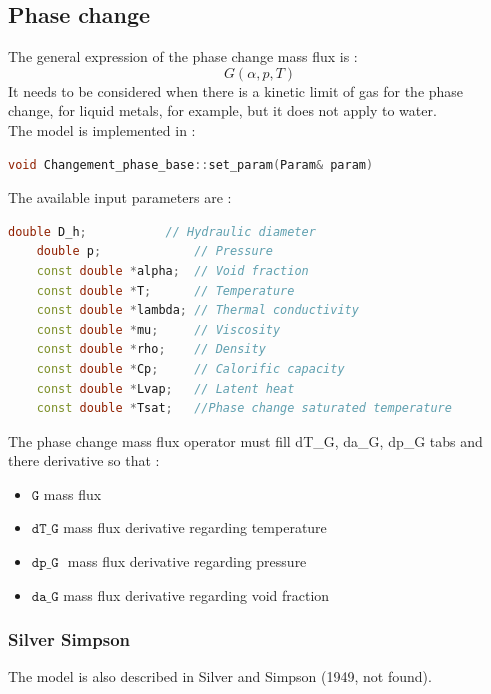 \subsection{Phase change}
The general expression of the phase change mass flux is :
\begin{equation}
    G(\alpha,p,T)
\end{equation}
It needs to be considered when there is a kinetic limit of gas for the phase change, for liquid metals, for example, but it does not apply to water.\\
The model is implemented in :
\begin{lstlisting}[language=c++]
void Changement_phase_base::set_param(Param& param)
\end{lstlisting}
The available input parameters are : 
\begin{lstlisting}[language=c++]
    double D_h;           // Hydraulic diameter
    double p;             // Pressure
    const double *alpha;  // Void fraction
    const double *T;      // Temperature
    const double *lambda; // Thermal conductivity
    const double *mu;     // Viscosity
    const double *rho;    // Density
    const double *Cp;     // Calorific capacity
    const double *Lvap;   // Latent heat
    const double *Tsat;   //Phase change saturated temperature
\end{lstlisting}
The phase change mass flux operator must fill dT_G, da_G, dp_G tabs and there derivative so that :
\begin{itemize}
    \item[\small \textcolor{blue}{\ding{109}}]$\texttt{G}$ mass flux
    \item[\small \textcolor{blue}{\ding{109}}] $\texttt{dT\_G}$ mass flux derivative regarding temperature   
    \item[\small \textcolor{blue}{\ding{109}}]$\texttt{dp\_G }$ mass flux derivative regarding pressure  
    \item[\small \textcolor{blue}{\ding{109}}]$\texttt{da\_G}$ mass flux derivative regarding void fraction  
\end{itemize}

\subsubsection{Silver Simpson}
The model is also described in  Silver and Simpson (1949, not found).

